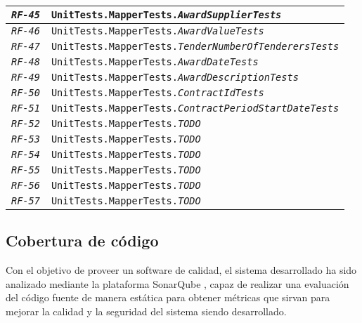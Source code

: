 \begin{longtable}{|| M{3cm} | M{12cm} ||}
                \hline
                    \texttt{\textit{RF-45}} & \texttt{UnitTests.MapperTests.\textit{AwardSupplierTests}} \\
                \hline
                    \texttt{\textit{RF-46}} & \texttt{UnitTests.MapperTests.\textit{AwardValueTests}} \\
                \hline
                    \texttt{\textit{RF-47}} & \texttt{UnitTests.MapperTests.\textit{TenderNumberOfTenderersTests}} \\
                \hline
                    \texttt{\textit{RF-48}} & \texttt{UnitTests.MapperTests.\textit{AwardDateTests}} \\
                \hline
                    \texttt{\textit{RF-49}} & \texttt{UnitTests.MapperTests.\textit{AwardDescriptionTests}} \\
                \hline
                    \texttt{\textit{RF-50}} & \texttt{UnitTests.MapperTests.\textit{ContractIdTests}} \\
                \hline
                    \texttt{\textit{RF-51}} & \texttt{UnitTests.MapperTests.\textit{ContractPeriodStartDateTests}} \\
                \hline
                    \texttt{\textit{RF-52}} & \texttt{UnitTests.MapperTests.\textit{TODO}} \\
                \hline
                    \texttt{\textit{RF-53}} & \texttt{UnitTests.MapperTests.\textit{TODO}} \\
                \hline
                    \texttt{\textit{RF-54}} & \texttt{UnitTests.MapperTests.\textit{TODO}} \\
                \hline
                    \texttt{\textit{RF-55}} & \texttt{UnitTests.MapperTests.\textit{TODO}} \\
                \hline
                    \texttt{\textit{RF-56}} & \texttt{UnitTests.MapperTests.\textit{TODO}} \\
                \hline
                    \texttt{\textit{RF-57}} & \texttt{UnitTests.MapperTests.\textit{TODO}} \\
                \hline
        \end{longtable}
        \addtocounter{table}{-1}
        
    \vspace{1cm}
        
    \subsection{Cobertura de código}
        Con el objetivo de proveer un software de calidad, el sistema desarrollado ha sido analizado mediante la plataforma SonarQube \cite{SONARQUBE}, capaz de realizar una evaluación del código fuente de manera estática para obtener métricas que sirvan para mejorar la calidad y la seguridad del sistema siendo desarrollado.
        \\ \\
        
    
\newpage